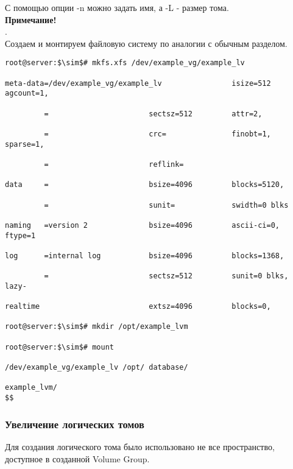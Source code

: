 \documentclass[14pt, a4paper]{article}
\begin{document}
С помощью опции -n можно задать имя, а -L - размер тома. \\

\textbf{Примечание!}  
\\ .\\

Создаем и монтируем файловую систему по аналогии с обычным разделом.
\vspace{0.3cm}

\begin{lstlisting}
root@server:$\sim$# mkfs.xfs /dev/example_vg/example_lv

meta-data=/dev/example_vg/example_lv                isize=512 agcount=1,

         =                       sectsz=512         attr=2,

         =                       crc=               finobt=1, sparse=1,

         =                       reflink=

data     =                       bsize=4096         blocks=5120,

         =                       sunit=             swidth=0 blks

naming   =version 2              bsize=4096         ascii-ci=0, ftype=1

log      =internal log           bsize=4096         blocks=1368,

         =                       sectsz=512         sunit=0 blks, lazy-
         
realtime                         extsz=4096         blocks=0,

root@server:$\sim$# mkdir /opt/example_lvm

root@server:$\sim$# mount

/dev/example_vg/example_lv /opt/ database/

example_lvm/
$$
\end{lstlisting}

\subsubsection*{Увеличение логических томов} 

Для создания логического тома было использовано не все пространство, доступное в созданной
Volume Group.
\vspace{0.3cm}
\end{document}
